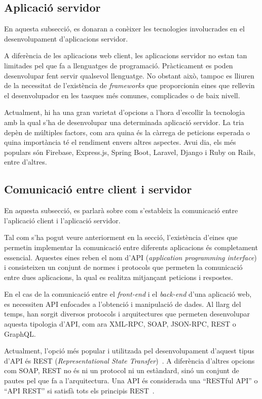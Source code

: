 \documentclass[a4paper,12pt]{ThesisStyle}
\begin{document}
\subsection{Aplicació servidor}

En aquesta subsecció, es donaran a conèixer les tecnologies involucrades en el desenvolupament d'aplicacions servidor.

A diferència de les aplicacions web client, les aplicacions servidor no estan tan limitades pel que fa a llenguatges de programació. Pràcticament es poden desenvolupar fent servir qualsevol llenguatge. No obstant això, tampoc es lliuren de la necessitat de l'existència de \textit{frameworks} que proporcionin eines que rellevin el desenvolupador en les tasques més comunes, complicades o de baix nivell.

Actualment, hi ha una gran varietat d'opcions a l'hora d'escollir la tecnologia amb la qual s'ha de desenvolupar una determinada aplicació servidor. La tria depèn de múltiples factors, com ara quina és la càrrega de peticions esperada o quina importància té el rendiment envers altres aspectes. Avui dia, els més populars són Firebase, Express.js, Spring Boot, Laravel, Django i Ruby on Rails, entre d'altres.

\subsection{Comunicació entre client i servidor}

En aquesta subsecció, es parlarà sobre com s'estableix la comunicació entre l'aplicació client i l'aplicació servidor.

Tal com s'ha pogut veure anteriorment en la secció, l'existència d'eines que permetin implementar la comunicació entre diferents aplicacions és completament essencial. Aquestes eines reben el nom d'API (\textit{application programming interface}) i consisteixen un conjunt de normes i protocols que permeten la comunicació entre dues aplicacions, la qual es realitza mitjançant peticions i respostes.

En el cas de la comunicació entre el \textit{front-end} i el \textit{back-end} d'una aplicació web, es necessiten API enfocades a l'obtenció i manipulació de dades. Al llarg del temps, han sorgit diversos protocols i arquitectures que permeten desenvolupar aquesta tipologia d'API, com ara XML-RPC, SOAP, JSON-RPC, REST o GraphQL.

Actualment, l'opció més popular i utilitzada pel desenvolupament d'aquest tipus d'API és REST (\textit{Representational State Transfer})~\cite{REST}. A diferència d'altres opcions com SOAP, REST no és ni un protocol ni un estàndard, sinó un conjunt de pautes pel que fa a l'arquitectura. Una API és considerada una ``RESTful API'' o ``API REST'' si satisfà tots els principis REST~\cite{REST_CONSTRAINTS}.
\end{document}
